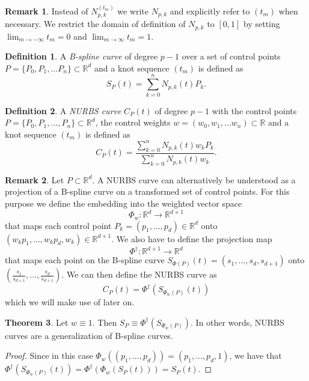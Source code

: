 \documentclass[a4paper, 11pt]{report}
\theoremstyle{definition}
\newtheorem{definition}{Definition}[section]
\newtheorem{theorem}[definition]{Theorem}
\newtheorem*{remark}{Remark}
\renewcommand{\emph}[1]{\textit{#1}}
\begin{document}
	\begin{remark}
		Instead of $N_{p,k}^{(t_m)}$ we write $N_{p,k}$ and explicitly refer to $(t_m)$ when necessary. We restrict the domain of definition of $N_{p,k}$ to $[0, 1]$ by setting $\lim_{m \to -\infty} t_m = 0$ and $\lim_{m \to \infty} t_m = 1$.
	\end{remark}

	\begin{definition}
		A \emph{B-spline curve} of degree $p-1$ over a set of control points $P = \{P_0, P_1, ... P_n\} \subset \mathbb{R}^d$ and a knot sequence $(t_m)$ is defined as $$ S_P(t) = \sum_{k=0}^{n} N_{p,k}(t) P_k.$$
	\end{definition}

	\begin{definition}\label{def:nurbs}
		A \emph{NURBS curve} $C_P(t)$ of degree $p-1$ with the control points $P = \{P_0, P_1, ..., P_n\} \subset \mathbb{R}^d$, the control weights $w = (w_0, w_1, ... w_n) \subset \mathbb{R}$ and a knot sequence $(t_m)$ is defined as
		\begin{equation}
			C_P(t) = \frac{\sum_{k=0}^n N_{p,k}(t) w_k P_k}{\sum_{k=0}^n N_{p,k}(t) w_k}.
		\end{equation}
	\end{definition}

	\begin{remark}
		Let $P \subset \mathbb{R}^d$. A NURBS curve can alternatively be understood as a projection of a B-spline curve on a transformed set of control points. For this purpose we define the embedding into the weighted vector space
			$$\Phi_w: \mathbb{R}^d \rightarrow \mathbb{R}^{d+1}$$
		that maps each control point $P_k = (p_1, ..., p_d) \in \mathbb{R}^d$ onto $(w_k p_1, ..., w_k p_d, w_k) \in \mathbb{R}^{d+1}$.
		We also have to define the projection map
			$$\Phi^\dagger: \mathbb{R}^{d+1} \rightarrow \mathbb{R}^d$$ 
		that maps each point on the B-spline curve $S_{\Phi(P)}(t) = (s_1, ..., s_d, s_{d+1})$ onto $(\frac{s_1}{s_{d+1}}, ..., \frac{s_d}{s_{d+1}})$.
		We can then define the NURBS curve as
				$$ C_P(t) = \Phi^\dagger(S_{\Phi_w(P)}(t))$$ 
		which we will make use of later on.
	\end{remark}

	\begin{theorem}
		Let $w \equiv 1$. Then $S_P \equiv \Phi^\dagger(S_{\Phi_w(P)})$. In other words, NURBS curves are a generalization of B-spline curves.
	\end{theorem}
	\begin{proof}
		Since in this case $\Phi_w((p_1, ..., p_d)) = (p_1, ..., p_d, 1)$, we have that $\Phi^\dagger(S_{\Phi_w(P)}(t)) = \Phi^\dagger(\Phi_w(S_P(t))) = S_P(t)$.
	\end{proof}
\end{document}
